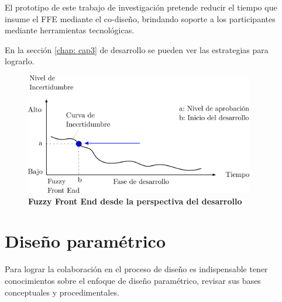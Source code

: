 El prototipo de este trabajo de investigación pretende reducir el tiempo que insume el FFE mediante el co-diseño, brindando soporte a los participantes mediante herramientas tecnológicas. 

En la sección \ref{chap: cap3} de desarrollo se pueden ver las estrategias para lograrlo.

\begin{figure}
\centering
\includegraphics[width=10cm]{Img/CPD/fuzzy1.png}
\caption{\textbf{\footnotesize{Fuzzy Front End desde la perspectiva del desarrollo}}}
\label{fig:fuzzy2}
\end{figure}



\clearpage
\section{Diseño paramétrico} 
\label{disenoparam}
Para lograr la colaboración en el proceso de diseño es indispensable tener conocimientos sobre el enfoque de diseño paramétrico, revisar sus bases conceptuales y procedimentales.

